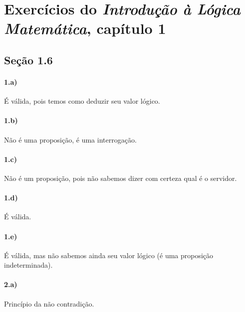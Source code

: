\documentclass[pdftex,a4paper,12pt,brazil]{article} %
\begin{document}
\section{Exercícios do \emph{Introdução à Lógica Matemática}, capítulo 1}
\label{ilm-1}


\subsection{Seção 1.6}
\label{ilm-1-16}

\paragraph{1.a)} É válida, pois temos como deduzir seu valor lógico.

\paragraph{1.b)} Não é uma proposição, é uma interrogação.

\paragraph{1.c)} Não é um proposição, pois não sabemos dizer com certeza qual é o servidor.

\paragraph{1.d)} É válida.

\paragraph{1.e)} É válida, mas não sabemos ainda seu valor lógico (é uma proposição indeterminada).

\paragraph{2.a)} Princípio da não contradição.
\end{document}
